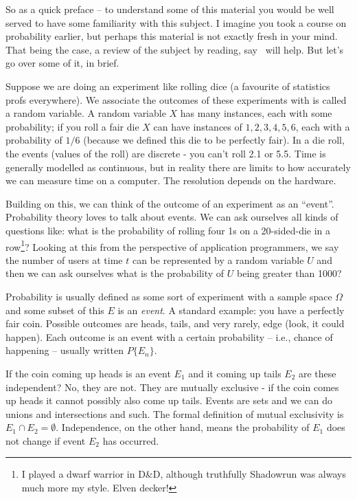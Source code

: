 \documentclass[a4paper]{report}
\begin{document}
So as a quick preface -- to understand some of this material you would be well served to have some familiarity with this subject. I imagine you took a course on probability earlier, but perhaps this material is not exactly fresh in your mind. That being the case, a review of the subject by reading, say~\cite{swps,pmd} will help. But let's go over some of it, in brief. 

Suppose we are doing an experiment like rolling dice (a favourite of statistics profs everywhere). We associate the outcomes of these experiments with is called a random variable. A random variable $X$ has many instances, each with some probability; if you roll a fair die $X$ can have instances of ${1, 2, 3, 4, 5, 6}$, each with a probability of $1/6$ (because we defined this die to be perfectly fair). In a die roll, the events (values of the roll) are discrete - you can't roll 2.1 or 5.5. Time is generally modelled as continuous, but in reality there are limits to how accurately we can measure time on a computer. The resolution depends on the hardware. 

Building on this, we can think of the outcome of an experiment as an ``event''. Probability theory loves to talk about events. We can ask ourselves all kinds of questions like: what is the probability of rolling four 1s on a 20-sided-die in a row\footnote{I played a dwarf warrior in D\&D, although truthfully Shadowrun was always much more my style. Elven decker!}? Looking at this from the perspective of application programmers, we say the number of users at time $t$ can be represented by a random variable $U$ and then we can ask ourselves what is the probability of $U$ being greater than 1000?

Probability is usually defined as some sort of experiment with a sample space $\Omega$ and some subset of this $E$ is an \textit{event}. A standard example: you have a perfectly fair coin. Possible outcomes are heads, tails, and very rarely, edge (look, it could happen). Each outcome is an event with a certain probability -- i.e., chance of happening -- usually written $P\{E_{n}\}$.

If the coin coming up heads is an event $E_{1}$ and it coming up tails $E_{2}$ are these independent? No, they are not. They are mutually exclusive - if the coin comes up heads it cannot possibly also come up tails. Events are sets and we can do unions and intersections and such. The formal definition of mutual exclusivity is $E_{1} \cap E_{2} = \emptyset$. Independence, on the other hand, means the probability of $E_{1}$ does not change if event $E_{2}$ has occurred.
\end{document}
